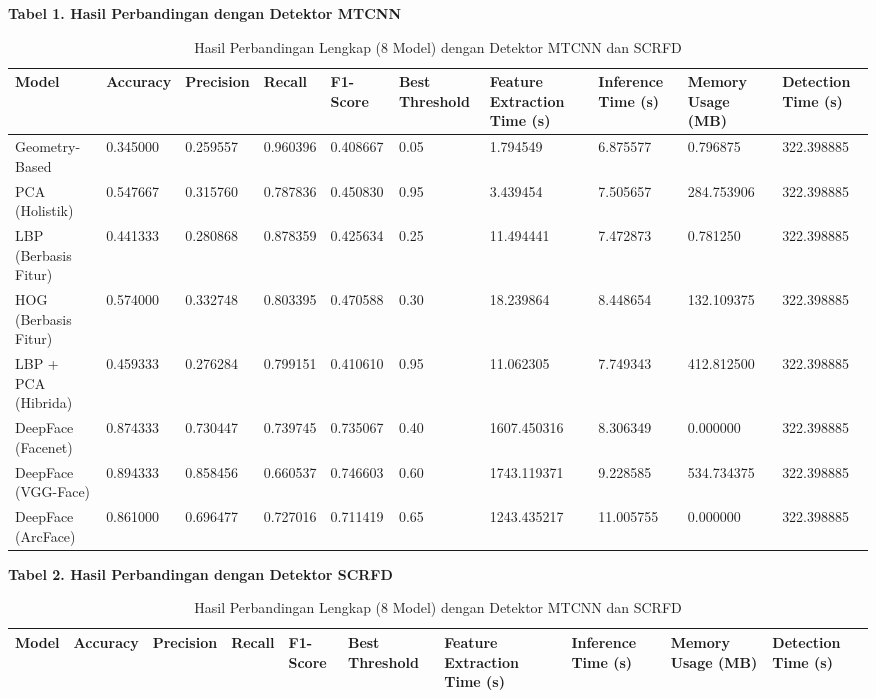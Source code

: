 \begin{table}
    \centering
    \caption{Hasil Perbandingan Lengkap (8 Model) dengan Detektor MTCNN dan SCRFD}
    \label{tab:hasil_perbandingan_lengkap}

    \textbf{Tabel 1. Hasil Perbandingan dengan Detektor MTCNN}\\[0.5em]
    \begin{tabular}{|p{3cm}|p{1.5cm}|p{1.5cm}|p{1.5cm}|p{1.5cm}|p{1.5cm}|p{2.5cm}|p{2cm}|p{2cm}|p{2cm}|}
        \hline
        \textbf{Model} & \textbf{Accuracy} & \textbf{Precision} & \textbf{Recall} & \textbf{F1-Score} & \textbf{Best Threshold} & \textbf{Feature Extraction Time (s)} & \textbf{Inference Time (s)} & \textbf{Memory Usage (MB)} & \textbf{Detection Time (s)} \\ \hline

        Geometry-Based      & 0.345000 & 0.259557 & 0.960396 & 0.408667 & 0.05 & 1.794549    & 6.875577  & 0.796875   & 322.398885 \\ \hline
        PCA (Holistik)      & 0.547667 & 0.315760 & 0.787836 & 0.450830 & 0.95 & 3.439454    & 7.505657  & 284.753906 & 322.398885 \\ \hline
        LBP (Berbasis Fitur)& 0.441333 & 0.280868 & 0.878359 & 0.425634 & 0.25 & 11.494441   & 7.472873  & 0.781250   & 322.398885 \\ \hline
        HOG (Berbasis Fitur)& 0.574000 & 0.332748 & 0.803395 & 0.470588 & 0.30 & 18.239864   & 8.448654  & 132.109375 & 322.398885 \\ \hline
        LBP + PCA (Hibrida) & 0.459333 & 0.276284 & 0.799151 & 0.410610 & 0.95 & 11.062305   & 7.749343  & 412.812500 & 322.398885 \\ \hline
        DeepFace (Facenet)  & 0.874333 & 0.730447 & 0.739745 & 0.735067 & 0.40 & 1607.450316 & 8.306349  & 0.000000   & 322.398885 \\ \hline
        DeepFace (VGG-Face) & 0.894333 & 0.858456 & 0.660537 & 0.746603 & 0.60 & 1743.119371 & 9.228585  & 534.734375 & 322.398885 \\ \hline
        DeepFace (ArcFace)  & 0.861000 & 0.696477 & 0.727016 & 0.711419 & 0.65 & 1243.435217 & 11.005755 & 0.000000   & 322.398885 \\ \hline

    \end{tabular}

    \vspace{1.5em}

    \textbf{Tabel 2. Hasil Perbandingan dengan Detektor SCRFD}\\[0.5em]
    \begin{tabular}{|p{3cm}|p{1.5cm}|p{1.5cm}|p{1.5cm}|p{1.5cm}|p{1.5cm}|p{2.5cm}|p{2cm}|p{2cm}|p{2cm}|}
        \hline
        \textbf{Model} & \textbf{Accuracy} & \textbf{Precision} & \textbf{Recall} & \textbf{F1-Score} & \textbf{Best Threshold} & \textbf{Feature Extraction Time (s)} & \textbf{Inference Time (s)} & \textbf{Memory Usage (MB)} & \textbf{Detection Time (s)} \\ \hline


\end{tabular}
\end{table}
